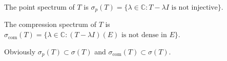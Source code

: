 The point spectrum of $T$ is $\sigma_p(T) = \{\lambda \in \mathbb{C} : T - \lambda I \text{ is not injective}\}$.

The compression spectrum of $T$ is $\sigma_{\text{com}}(T) = \{\lambda \in \mathbb{C} : (T - \lambda I)(E) \text{ is not dense in } E\}$.

Obviously $\sigma_p(T) \subset \sigma(T)$ and $\sigma_{\text{com}}(T) \subset \sigma(T)$.
